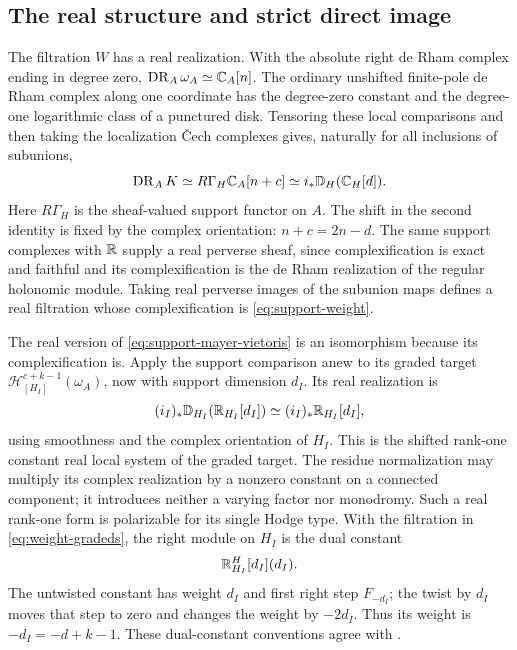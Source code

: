 \subsection{The real structure and strict direct image}

The filtration \(W\) has a real realization.  With the absolute right
de Rham complex ending in degree zero, \(\operatorname{DR}_A\omega_A\simeq\mathbb C_A[n]\).
The ordinary unshifted finite-pole de Rham complex along one coordinate
has the degree-zero constant and the degree-one logarithmic class of a punctured disk.
Tensoring these local comparisons and then taking the localization
\v Cech complexes gives, naturally for all inclusions of subunions,
\begin{equation}\label{eq:real-support}
 \operatorname{DR}_A K\simeq R\Gamma_H\mathbb C_A[n+c]
 \simeq i_*\mathbb D_H(\mathbb C_H[d]).
\end{equation}
Here \(R\Gamma_H\) is the sheaf-valued support functor on \(A\).
The shift in the second identity is fixed by the complex orientation:
\(n+c=2n-d\).  The same support complexes with \(\mathbb R\) supply a real
perverse sheaf, since complexification is exact and faithful and its
complexification is the de Rham realization of the regular holonomic
module.  Taking real perverse images of the subunion maps defines a real
filtration whose complexification is \eqref{eq:support-weight}.

The real version of \eqref{eq:support-mayer-vietoris} is an isomorphism
because its complexification is.  Apply the support comparison anew to
its graded target \(\mathcal H^{c+k-1}_{[H_I]}(\omega_A)\), now with
support dimension \(d_I\).  Its real realization is
\[
 (i_I)_*\mathbb D_{H_I}(\mathbb R_{H_I}[d_I])
 \simeq (i_I)_*\mathbb R_{H_I}[d_I],
\]
using smoothness and the complex orientation of \(H_I\).  This is the
shifted rank-one constant real local system of the graded target.
The residue normalization may multiply its complex realization
by a nonzero constant on a connected component; it introduces neither
a varying factor nor monodromy.  Such a real rank-one form is polarizable
for its single Hodge type.  With the filtration in
\eqref{eq:weight-gradeds}, the right module on \(H_I\) is the dual
constant
\[
 \mathbb R^H_{H_I}[d_I](d_I).
\]
The untwisted constant has weight \(d_I\) and first right step
\(F_{-d_I}\); the twist by \(d_I\) moves that step to zero and changes
the weight by \(-2d_I\).  Thus its weight is
\(-d_I=-d+k-1\).  These dual-constant conventions agree with
\cite[equations~(1.2.1)--(1.2.6) and Theorem~2.3]{FujinoFujisawaSaito2014}.


